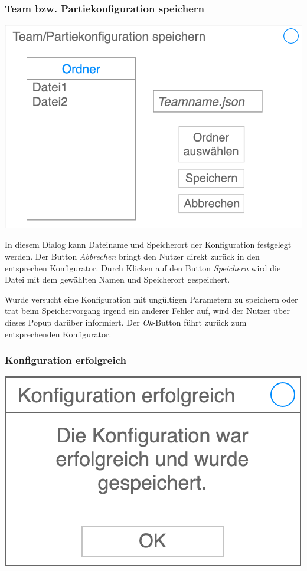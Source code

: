 \documentclass[a4paper,12pt,
headsepline,           %
oneside,               %
pointlessnumbers,      %
bibtotoc,              %
]{scrartcl}
\begin{document}
	\subsubsection{Team bzw. Partiekonfiguration speichern}
	
	\includegraphics[scale=0.3]{images/speichern}
	
	In diesem Dialog kann Dateiname und Speicherort der Konfiguration festgelegt werden. Der Button \textit{Abbrechen} bringt den Nutzer direkt zurück in den entsprechen Konfigurator. Durch Klicken auf den Button \textit{Speichern} wird die Datei mit dem gewählten Namen und Speicherort gespeichert.
	
	Wurde versucht eine Konfiguration mit ungültigen Parametern zu speichern oder trat beim Speichervorgang irgend ein anderer Fehler auf, wird der Nutzer über dieses Popup darüber informiert. Der \textit{Ok}-Button führt zurück zum entsprechenden Konfigurator.
	
	\subsubsection{Konfiguration erfolgreich}
	
	\includegraphics[scale=0.2]{images/konfiguration_erfolgreich}
	
\end{document}
